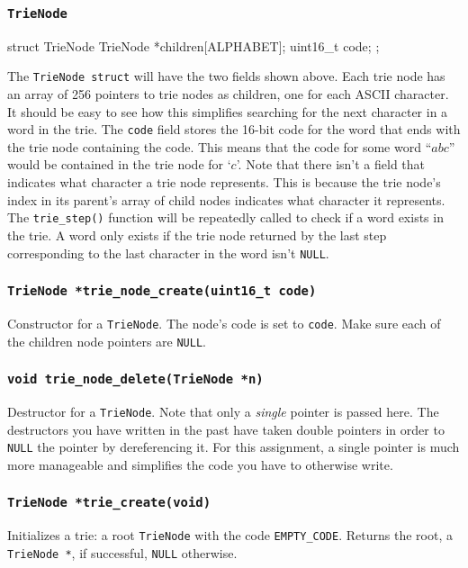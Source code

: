 \documentclass{article}
\begin{document}
\subsubsection{\texttt{TrieNode}}

\begin{clisting}{}
struct TrieNode {
    TrieNode *children[ALPHABET];
    uint16_t code;
};
\end{clisting}

The \texttt{TrieNode struct} will have the two fields shown above. Each trie
node has an array of 256 pointers to trie nodes as children, one for
each ASCII character. It should be easy to see how this simplifies
searching for the next character in a word in the trie. The
\texttt{code} field stores the 16-bit code for the word that ends with
the trie node containing the code. This means that the code for some
word ``$abc$'' would be contained in the trie node for `$c$'.  Note that
there isn't a field that indicates what character a trie node
represents. This is because the trie node's index in its parent's array
of child nodes indicates what character it represents. The
\texttt{trie\_step()} function will be repeatedly called to check if a
word exists in the trie. A word only exists if the trie node returned by
the last step corresponding to the last character in the word isn't
\texttt{NULL}.

\subsubsection{\texttt{TrieNode *trie\_node\_create(uint16\_t code)}}
Constructor for a \texttt{TrieNode}. The node's code is set to
\texttt{code}. Make sure each of the children node pointers are
\texttt{NULL}.

\subsubsection{\texttt{void trie\_node\_delete(TrieNode *n)}}
Destructor for a \texttt{TrieNode}. Note that only a \emph{single}
pointer is passed here. The destructors you have written in the past
have taken double pointers in order to \texttt{NULL} the pointer by
dereferencing it. For this assignment, a single pointer is much
more manageable and simplifies the code you have to otherwise write.

\subsubsection{\texttt{TrieNode *trie\_create(void)}}
Initializes a trie: a root \texttt{TrieNode} with the code
\texttt{EMPTY\_CODE}. Returns the root, a \texttt{TrieNode *}, if
successful, \texttt{NULL} otherwise.
\end{document}
